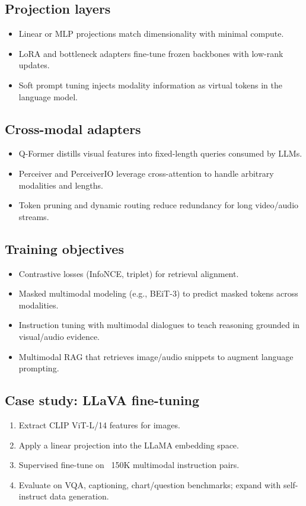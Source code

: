 \documentclass{article}
\begin{document}
\subsection{Projection layers}
\begin{itemize}
  \item Linear or MLP projections match dimensionality with minimal compute.
  \item LoRA and bottleneck adapters fine-tune frozen backbones with low-rank updates.
  \item Soft prompt tuning injects modality information as virtual tokens in the language model.
\end{itemize}

\subsection{Cross-modal adapters}
\begin{itemize}
  \item Q-Former distills visual features into fixed-length queries consumed by LLMs.
  \item Perceiver and PerceiverIO leverage cross-attention to handle arbitrary modalities and lengths.
  \item Token pruning and dynamic routing reduce redundancy for long video/audio streams.
\end{itemize}

\subsection{Training objectives}
\begin{itemize}
  \item Contrastive losses (InfoNCE, triplet) for retrieval alignment.
  \item Masked multimodal modeling (e.g., BEiT-3) to predict masked tokens across modalities.
  \item Instruction tuning with multimodal dialogues to teach reasoning grounded in visual/audio evidence.
  \item Multimodal RAG that retrieves image/audio snippets to augment language prompting.
\end{itemize}

\subsection{Case study: LLaVA fine-tuning}
\begin{enumerate}
  \item Extract CLIP ViT-L/14 features for images.
  \item Apply a linear projection into the LLaMA embedding space.
  \item Supervised fine-tune on ~150K multimodal instruction pairs.
  \item Evaluate on VQA, captioning, chart/question benchmarks; expand with self-instruct data generation.
\end{enumerate}
\end{document}
